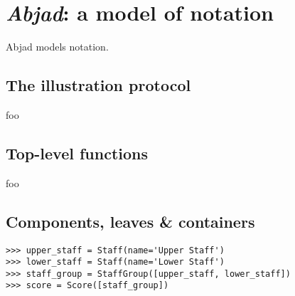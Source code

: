 \chapter{\emph{Abjad}: a model of notation}

\begin{comment}
<abjad>[hide=true]
import collections
import consort
</abjad>
\end{comment}

Abjad models notation.

\section{The illustration protocol}

foo

\section{Top-level functions}

foo

\section{Components, leaves \& containers}

\begin{comment}
<abjad>
upper_staff = Staff(name='Upper Staff')
lower_staff = Staff(name='Lower Staff')
staff_group = StaffGroup([upper_staff, lower_staff])
score = Score([staff_group])
</abjad>
\end{comment}

\begin{singlespacing}
\vspace{-0.5\baselineskip}
\begin{lstlisting}
>>> upper_staff = Staff(name='Upper Staff')
>>> lower_staff = Staff(name='Lower Staff')
>>> staff_group = StaffGroup([upper_staff, lower_staff])
>>> score = Score([staff_group])
\end{lstlisting}
\end{singlespacing}

